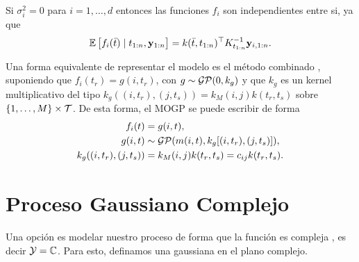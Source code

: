 \begin{proposition}
	Si \(\sigma_{i}^{2} = 0\) para \(i = 1, \dotsc, d\) entonces las funciones \(f_{i}\) son independientes entre si, ya que
	\begin{equation*}
		\mathbb{E}\left[ f_{i}(\bar{t}) \mid t_{1:n}, \mathbf{y}_{1:n}\right] = k(\bar{t}, t_{1:n})^{\top} K_{t_{1:n}}^{-1} \mathbf{y}_{i,1:n}.
	\end{equation*}
\end{proposition}

Una forma equivalente de representar el modelo es el método combinado \cite{44}, suponiendo que \(f_{i}(t_{r}) = g(i, t_{r})\), con \(g \sim \operatorname{\mathcal{GP}}(0, k_{g})\) y que \(k_{g}\) es un kernel multiplicativo del tipo \(k_{g}((i, t_{r}), (j, t_{s})) = k_{M}(i, j) k(t_{r}, t_{s})\) sobre \(\{1, \dotsc, M\} \times \mathcal{T}\). De esta forma, el MOGP se puede escribir de forma
\begin{align*}
	f_{i}(t)						&= g(i, t), \\
	g(i, t)							&\sim \operatorname{\mathcal{GP}}(m(i, t), k_{g}[(i, t_{r}), (j, t_{s})]), \\
	k_{g}((i, t_{r}), (j, t_{s}))	&= k_{M}(i, j) k(t_{r}, t_{s}) = c_{ij} k(t_{r}, t_{s}).
\end{align*}


\section{Proceso Gaussiano Complejo}


Una opción es modelar nuestro proceso de forma que la función es compleja \cite{tobar2015modelling}, es decir \(\mathcal{Y} = \mathbb{C}\). Para esto, definamos una gaussiana en el plano complejo.

